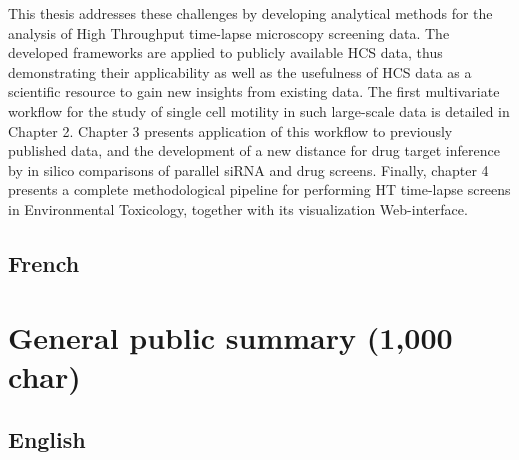 \documentclass[12pt]{article}
\begin{document}
This thesis addresses these challenges by developing analytical methods for the analysis of High Throughput time-lapse microscopy screening data. The developed frameworks are applied to publicly available HCS data, thus demonstrating their applicability as well as the usefulness of HCS data as a scientific resource to gain new insights from existing data. The first multivariate workflow for the study of single cell motility in such large-scale data is detailed in Chapter 2. Chapter 3 presents application of this workflow to previously published data, and the development of a new distance for drug target inference by in silico comparisons of parallel siRNA and drug screens. Finally, chapter 4 presents a complete methodological pipeline for performing HT time-lapse screens in Environmental Toxicology, together with its visualization Web-interface.




\subsection{French}

\section{General public summary (1,000 char)}
\subsection{English}
%
%
%
\end{document}
